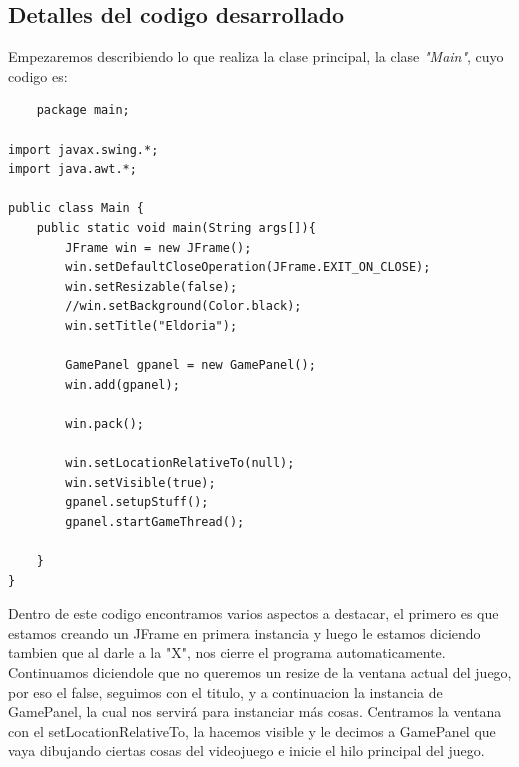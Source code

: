 \documentclass[a4paper]{article}
\begin{document}
\subsection{Detalles del codigo desarrollado}
Empezaremos describiendo lo que realiza la clase principal, la clase \textit{"Main"}, cuyo codigo es:
\begin{lstlisting}
    package main;

import javax.swing.*;
import java.awt.*;

public class Main {
    public static void main(String args[]){
        JFrame win = new JFrame();
        win.setDefaultCloseOperation(JFrame.EXIT_ON_CLOSE);
        win.setResizable(false);
        //win.setBackground(Color.black);
        win.setTitle("Eldoria");

        GamePanel gpanel = new GamePanel();
        win.add(gpanel);

        win.pack();

        win.setLocationRelativeTo(null);
        win.setVisible(true);
        gpanel.setupStuff();
        gpanel.startGameThread();

    }
}
\end{lstlisting}
Dentro de este codigo encontramos varios aspectos a destacar, el primero es que estamos creando un JFrame en primera instancia y luego le estamos diciendo tambien que al darle a la "X", nos cierre el programa automaticamente.
Continuamos diciendole que no queremos un resize de la ventana actual del juego, por eso el false, seguimos con el titulo, y a continuacion la instancia de GamePanel, la cual nos servirá para instanciar más cosas.
Centramos la ventana con el setLocationRelativeTo, la hacemos visible y le decimos a GamePanel que vaya dibujando ciertas cosas del videojuego e inicie el hilo principal del juego.

\clearpage
\end{document}
